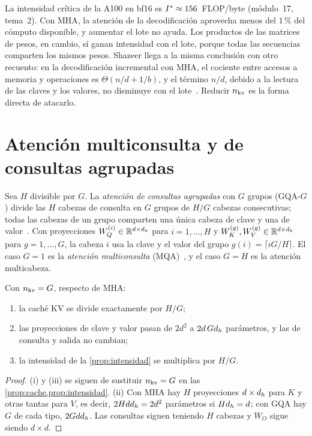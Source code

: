 La intensidad crítica de la A100 en bf16 es $I^{\ast}\approx 156$~FLOP/byte (módulo~17, tema~2). Con MHA, la atención de la decodificación aprovecha menos del $1\,\%$ del cómputo disponible, y aumentar el lote no ayuda. Los productos de las matrices de pesos, en cambio, sí ganan intensidad con el lote, porque todas las secuencias comparten los mismos pesos. Shazeer llega a la misma conclusión con otro recuento: en la decodificación incremental con MHA, el cociente entre accesos a memoria y operaciones es $\Theta(n/d+1/b)$, y el término $n/d$, debido a la lectura de las claves y los valores, no disminuye con el lote~\cite[§2.4.1]{mqa}. Reducir $n_{\mathrm{kv}}$ es la forma directa de atacarlo.

\section{Atención multiconsulta y de consultas agrupadas}

\begin{definicion}\label{def:gqa}
Sea $H$ divisible por $G$. La \emph{atención de consultas agrupadas} con $G$ grupos (GQA-$G$) divide las $H$ cabezas de consulta en $G$ grupos de $H/G$ cabezas consecutivas; todas las cabezas de un grupo comparten una única cabeza de clave y una de valor~\cite[§2.2]{gqa}. Con proyecciones $W_Q^{(i)}\in\mathbb{R}^{d\times d_{h}}$ para $i=1,\dots,H$ y $W_K^{(g)},W_V^{(g)}\in\mathbb{R}^{d\times d_{h}}$ para $g=1,\dots,G$, la cabeza $i$ usa la clave y el valor del grupo $g(i)=\lceil iG/H\rceil$. El caso $G=1$ es la \emph{atención multiconsulta} (MQA)~\cite[§3]{mqa}, y el caso $G=H$ es la atención multicabeza.
\end{definicion}

\begin{proposicion}\label{prop:gqa}
Con $n_{\mathrm{kv}}=G$, respecto de MHA:
\begin{enumerate}
  \item la caché KV se divide exactamente por $H/G$;
  \item las proyecciones de clave y valor pasan de $2d^{2}$ a $2d\,Gd_{h}$ parámetros, y las de consulta y salida no cambian;
  \item la intensidad de la \cref{prop:intensidad} se multiplica por $H/G$.
\end{enumerate}
\end{proposicion}

\begin{proof}
(i) y (iii) se siguen de sustituir $n_{\mathrm{kv}}=G$ en las \cref{prop:cache,prop:intensidad}. (ii) Con MHA hay $H$ proyecciones $d\times d_{h}$ para $K$ y otras tantas para $V$, es decir, $2Hdd_{h}=2d^{2}$ parámetros si $Hd_{h}=d$; con GQA hay $G$ de cada tipo, $2Gdd_{h}$. Las consultas siguen teniendo $H$ cabezas y $W_O$ sigue siendo $d\times d$.
\end{proof}

